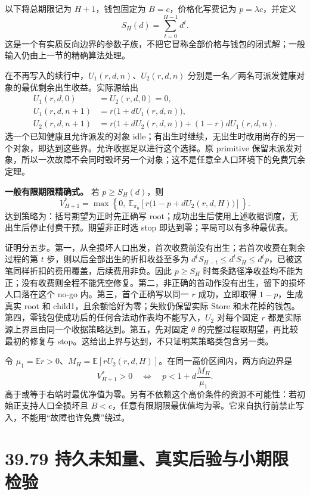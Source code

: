 \documentclass[
  11pt,
  oneside]{book}
\begin{document}
以下将总期限记为 \(H+1\)，钱包固定为 \(B=c\)，价格化写费记为 \(p=\lambda c\)，并定义 \[S_H(d)=\sum_{t=0}^{H-1}d^t.\] 这是一个有实质反向边界的参数子族，不把它冒称全部价格与钱包的闭式解；一般输入仍由上一节的精确算法处理。

在不再写入的续行中，\(U_1(r,d,n)\)、\(U_2(r,d,n)\) 分别是一名／两名可派发健康对象的最优剩余出生收益。实际源给出 \[\begin{aligned}
U_1(r,d,0)&=U_2(r,d,0)=0,\\
U_1(r,d,n+1)&=r\bigl(1+dU_1(r,d,n)\bigr),\\
U_2(r,d,n+1)&=r\bigl(1+dU_2(r,d,n)\bigr)
 +(1-r)dU_1(r,d,n).
\end{aligned}\] 选一个已知健康且允许派发的对象 idle；有出生时继续，无出生时改用尚存的另一个对象，即达到这些界。允许收据足以进行这个选择。原 primitive 保留未派发对象，所以一次故障不会同时毁坏另一个对象；这不是任意全人口环境下的免费冗余定理。

\textbf{一般有限期限精确式。} 若 \(p\ge S_H(d)\)，则 \[\boxed{\quad
V_{H+1}^*=
\max\left\{0,\ \mathbb E_{\pi_0}\!\left[
r\bigl(1-p+dU_2(r,d,H)\bigr)\right]\right\}.
\quad}\] 达到策略为：括号期望为正时先正确写 root；成功出生后使用上述收据调度，无出生后停止付费干预。期望非正时选 stop 即达到零；平局可以有多种最优表。

证明分五步。第一，从全损坏人口出发，首次收费前没有出生；若首次收费在剩余过程的第 \(t\) 步，则以后全部出生的折扣收益至多为 \(d^tS_{H-t}\le d^tS_H\le d^tp\)，已被这笔同样折扣的费用覆盖，后续费用非负。因此 \(p\ge S_H\) 时每条路径净收益均不能为正；没有收费则全程不能凭空修复。第二，非正确的首动作没有出生，留下的损坏人口落在这个 no-go 内。第三，首个正确写以同一 \(r\) 成功，立即取得 \(1-p\)，生成真实 root 和 child1，且余额恰好为零；失败仍保留实际 Store 和未花掉的钱包。第四，零钱包使成功后的任何合法动作表均不能写入，\(U_2\) 对每个固定 \(r\) 都是实际源上界且由同一个收据策略达到。第五，先对固定 \(\theta\) 的完整过程取期望，再比较最初的修复与 stop。这给出上界与达到，不只证明某策略类包含另一类。

令 \(\mu_1=\mathbb E r>0\)、\(M_H=\mathbb E[rU_2(r,d,H)]\)。在同一高价区间内，两方向边界是 \[V_{H+1}^*>0
\quad\Longleftrightarrow\quad
p<1+d\frac{M_H}{\mu_1}.\] 高于或等于右端时最优净值为零。另有不依赖这个高价条件的资源不可能性：若初始正支持人口全损坏且 \(B<c\)，任意有限期限最优值均为零。它来自执行前禁止写入，不能用``故障也许免费''绕过。

\section{39.79 持久未知量、真实后验与小期限检验}\label{ux6301ux4e45ux672aux77e5ux91cfux771fux5b9eux540eux9a8cux4e0eux5c0fux671fux9650ux68c0ux9a8c}
\end{document}
